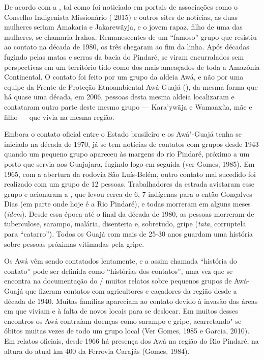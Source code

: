 De acordo com a , tal como foi noticiado em portais de associações
como o Conselho Indigenista Missionário ( 2015) e outros sites de
notícias, as duas mulheres seriam Amakaria e Jakarewãyja, e o jovem
rapaz, filho de uma das mulheres, se chamaria Irahoa. Remanescentes de
um ``famoso'' grupo que resistiu ao contato na década de 1980, os três
chegaram ao fim da linha. Após décadas fugindo pelas matas e serras da
bacia do Pindaré, se viram encurralados sem perspectivas em um
território tido como dos mais ameaçados de toda a Amazônia Continental.
O contato foi feito por um grupo da aldeia Awá, e não por uma equipe da
Frente de Proteção Etnoambiental Awá-Guajá (), da mesma forma que
há quase uma década, em 2006, pessoas desta mesma aldeia localizaram e
contataram outra parte deste mesmo grupo --- Kara'ywãja e Wamaaxũa, mãe e
filho --- que vivia na mesma região.

Embora o contato oficial entre o Estado brasileiro e os Awá"-Guajá tenha
se iniciado na década de 1970, já se tem notícias de contatos com grupos
desde 1943 quando um pequeno grupo apareceu às margens do rio Pindaré,
próximo a um posto que servia aos Guajajara, fugindo logo em seguida
(ver Gomes, 1985). Em 1965, com a abertura da rodovia São Luís-Belém,
outro contato mal sucedido foi realizado com um grupo de 12 pessoas.
Trabalhadores da estrada avistaram esse grupo e acionaram a , que
levou cerca de 6, 7 indígenas para o entã̃o  Gonçalves Dias (em parte
onde hoje é a  Rio Pindaré), e todas morreram em alguns meses (\emph{idem}).
Desde essa época até o final da década de 1980, as pessoas morreram de
tuberculose, sarampo, malária, disenteria e, sobretudo, gripe
(\emph{tata}, corruptela para ``catarro''). Todos os Guajá com mais de
25-30 anos guardam uma história sobre pessoas próximas vitimadas pela
gripe.

Os Awá vêm sendo contatados lentamente, e a assim chamada ``história do
contato'' pode ser definida como ``histórias dos contatos'', uma vez que
se encontra na documentação do / muitos relatos sobre pequenos
grupos de Awá-Guajá que fizeram contatos com agricultores e caçadores da
região desde a década de 1940. Muitas famílias apareciam ao contato
devido à invasão das áreas em que viviam e à falta de novos locais para
se deslocar. Em muitos desses encontros os Awá contraíam doenças como
sarampo e gripe, acarretando"-se óbitos muitas vezes de todo um grupo
local (Ver Gomes, 1985 e Garcia, 2010). Em relatos oficiais, desde 1966 há
presença dos Awá na região do Rio Pindaré, na altura do atual km 400 da
Ferrovia Carajás (Gomes, 1984).

